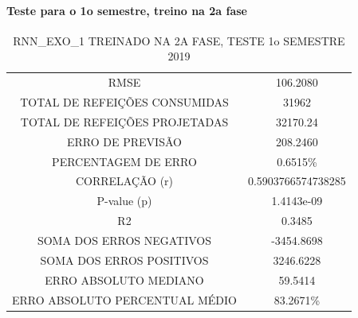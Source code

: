         \paragraph{Teste para o 1o semestre, treino na 2a fase}
            \begin{table}[!ht]
            \centering
            \caption{RNN\_EXO\_1 TREINADO NA 2A FASE, TESTE 1o SEMESTRE 2019}
            \label{table:case2_rnn_exo_2_incase1}
                \begin{tabular}{|c|c|}
                \rowcolor{gray!50}
                \hline
                \multicolumn{2}{c}{RNN\_EXO\_1 TREINADO NA 2A FASE, TESTE 1o SEMESTRE 2019}\\ \hline
                RMSE & 106.2080\\
                TOTAL DE REFEIÇÕES CONSUMIDAS & 31962\\
                TOTAL DE REFEIÇÕES PROJETADAS & 32170.24\\
                ERRO DE PREVISÃO & 208.2460 \\
                PERCENTAGEM DE ERRO & 0.6515\%  \\
                CORRELAÇÃO (r)& 0.5903766574738285 \\
                P-value (p) & 1.4143e-09\\
                R2 & 0.3485\\
                SOMA DOS ERROS NEGATIVOS & -3454.8698\\
                SOMA DOS ERROS POSITIVOS & 3246.6228\\
                ERRO ABSOLUTO MEDIANO & 59.5414\\
                ERRO ABSOLUTO PERCENTUAL MÉDIO & 83.2671\% \\ \hline
            \end{tabular}
            \end{table}
